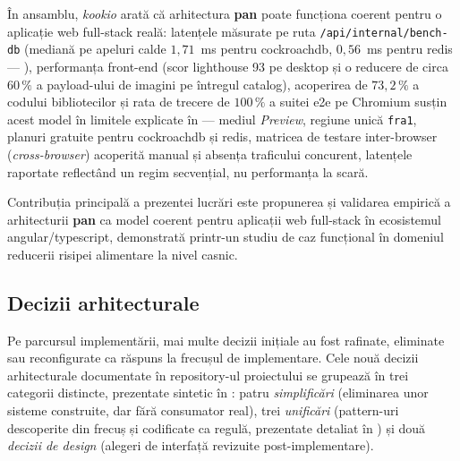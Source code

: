În ansamblu, \textit{\gls{kookio}} arată că arhitectura \textbf{\gls{pan}} poate funcționa coerent pentru o aplicație \gls{web} full-stack reală: latențele măsurate pe ruta \texttt{/api/internal/bench-db} (mediană pe apeluri calde \(1{,}71\)~ms pentru \gls{cockroachdb}, \(0{,}56\)~ms pentru \gls{redis} --- ), performanța front-end (scor \gls{lighthouse} 93 pe desktop și o reducere de circa \(60\,\%\) a payload-ului de imagini pe întregul catalog), acoperirea de \(73{,}2\,\%\) a codului bibliotecilor și rata de trecere de \(100\,\%\) a suitei \acrshort{e2e} pe Chromium susțin acest model în limitele explicate în  --- mediul \textit{Preview}, regiune unică \texttt{fra1}, planuri gratuite pentru \gls{cockroachdb} și \gls{redis}, matricea de testare inter-browser (\textit{cross-browser}) acoperită manual și absența traficului concurent, latențele raportate reflectând un regim secvențial, nu performanța la scară.

Contribuția principală a prezentei lucrări este propunerea și validarea empirică a arhitecturii \textbf{\gls{pan}} ca model coerent pentru aplicații \gls{web} full-stack în ecosistemul \gls{angular}/\gls{typescript}, demonstrată printr-un studiu de caz funcțional în domeniul reducerii risipei alimentare la nivel casnic.

\subsection{Decizii arhitecturale}\label{subsec:decizii-arhitecturale}

Pe parcursul implementării, mai multe decizii inițiale au fost rafinate, eliminate sau reconfigurate ca răspuns la frecușul de implementare. Cele nouă decizii arhitecturale documentate în repository-ul proiectului se grupează în trei categorii distincte, prezentate sintetic în : patru \textit{simplificări} (eliminarea unor sisteme construite, dar fără consumator real), trei \textit{unificări} (pattern-uri descoperite din frecuș și codificate ca regulă, prezentate detaliat în ) și două \textit{decizii de design} (alegeri de interfață revizuite post-implementare).

